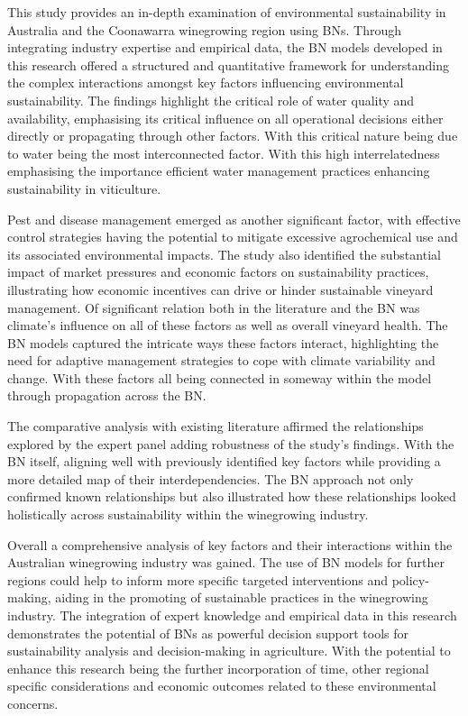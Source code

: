 This study provides an in-depth examination of environmental sustainability in Australia and the Coonawarra winegrowing region using BNs. Through integrating industry expertise and empirical data, the BN models developed in this research offered a structured and quantitative framework for understanding the complex interactions amongst key factors influencing environmental sustainability. The findings highlight the critical role of water quality and availability, emphasising its critical influence on all operational decisions either directly or propagating through other factors. With this critical nature being due to water being the most interconnected factor. With this high interrelatedness emphasising the importance efficient water management practices enhancing sustainability in viticulture.

Pest and disease management emerged as another significant factor, with effective control strategies having the potential to mitigate excessive agrochemical use and its associated environmental impacts. The study also identified the substantial impact of market pressures and economic factors on sustainability practices, illustrating how economic incentives can drive or hinder sustainable vineyard management. Of significant relation both in the literature and the BN was climate's influence on all of these factors as well as overall vineyard health. The BN models captured the intricate ways these factors interact, highlighting the need for adaptive management strategies to cope with climate variability and change. With these factors all being connected in someway within the model through propagation across the BN.

The comparative analysis with existing literature affirmed the relationships explored by the expert panel adding robustness of the study's findings. With the BN itself, aligning well with previously identified key factors while providing a more detailed map of their interdependencies. The BN approach not only confirmed known relationships but also illustrated how these relationships looked holistically across sustainability within the winegrowing industry.

Overall a comprehensive analysis of key factors and their interactions within the Australian winegrowing industry was gained. The use of BN models for further regions could help to inform more specific targeted interventions and policy-making, aiding in the promoting of sustainable practices in the winegrowing industry. The integration of expert knowledge and empirical data in this research demonstrates the potential of BNs as powerful decision support tools for sustainability analysis and decision-making in agriculture. With the potential to enhance this research being the further incorporation of time, other regional specific considerations and economic outcomes related to these environmental concerns.

